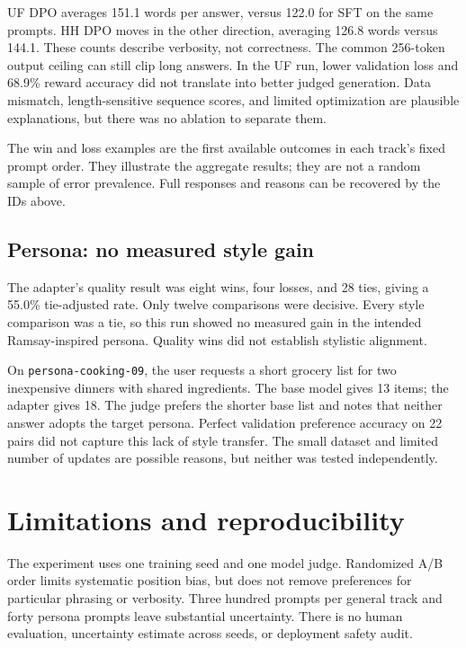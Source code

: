 \documentclass{article}
\begin{document}
UF DPO averages 151.1 words per answer, versus 122.0 for SFT on the same prompts. HH DPO moves in the other direction, averaging 126.8 words versus 144.1. These counts describe verbosity, not correctness. The common 256-token output ceiling can still clip long answers. In the UF run, lower validation loss and 68.9\% reward accuracy did not translate into better judged generation. Data mismatch, length-sensitive sequence scores, and limited optimization are plausible explanations, but there was no ablation to separate them.

The win and loss examples are the first available outcomes in each track's fixed prompt order. They illustrate the aggregate results; they are not a random sample of error prevalence. Full responses and reasons can be recovered by the IDs above.

\subsection{Persona: no measured style gain}
The adapter's quality result was eight wins, four losses, and 28 ties, giving a 55.0\% tie-adjusted rate. Only twelve comparisons were decisive. Every style comparison was a tie, so this run showed no measured gain in the intended Ramsay-inspired persona. Quality wins did not establish stylistic alignment.

On \texttt{persona-cooking-09}, the user requests a short grocery list for two inexpensive dinners with shared ingredients. The base model gives 13 items; the adapter gives 18. The judge prefers the shorter base list and notes that neither answer adopts the target persona. Perfect validation preference accuracy on 22 pairs did not capture this lack of style transfer. The small dataset and limited number of updates are possible reasons, but neither was tested independently.

\begin{table}[ht]
\centering
\caption{Persona results, kept separate from the general alignment tracks.}

\end{table}

\section{Limitations and reproducibility}
The experiment uses one training seed and one model judge. Randomized A/B order limits systematic position bias, but does not remove preferences for particular phrasing or verbosity. Three hundred prompts per general track and forty persona prompts leave substantial uncertainty. There is no human evaluation, uncertainty estimate across seeds, or deployment safety audit.
\end{document}
